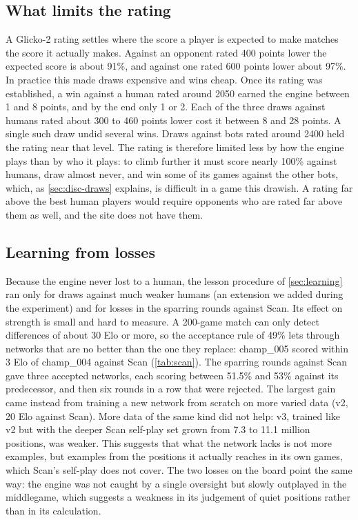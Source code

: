 \subsection{What limits the rating}\label{sec:disc-rating}

A Glicko-2 rating settles where the score a player is expected to make matches the
score it actually makes. Against an opponent rated 400 points lower the expected
score is about 91\%, and against one rated 600 points lower about 97\%. In
practice this made draws expensive and wins cheap. Once its rating was
established, a win against a human rated around 2050 earned the engine between 1
and 8 points, and by the end only 1 or 2. Each of the three draws against humans
rated about 300 to 460 points lower cost it between 8 and 28 points. A
single such draw undid several wins. Draws against bots rated
around 2400 held the rating near that level. The rating is therefore limited less
by how the engine plays than by who it plays: to climb further it must score
nearly 100\% against humans, draw almost never, and win some of its games against
the other bots, which, as \cref{sec:disc-draws} explains, is difficult in a game
this drawish. A rating far above the best human players would require opponents
who are rated far above them as well, and the site does not have them.

\subsection{Learning from losses}\label{sec:disc-learning}

Because the engine never lost to a human, the lesson procedure of
\cref{sec:learning} ran only for draws against much weaker humans (an extension
we added during the experiment) and for losses in the sparring rounds against
Scan. Its effect on strength is small and hard to measure. A 200-game match can
only detect differences of about 30 Elo or more, so the acceptance rule of 49\%
lets through networks that are no better than the one they replace: champ\_005
scored within 3 Elo of champ\_004 against Scan (\cref{tab:scan}). The sparring
rounds against Scan gave three accepted networks, each scoring between 51.5\%
and 53\% against its predecessor, and then six rounds in a row that were
rejected. The largest gain came instead from training a new network from scratch
on more varied data (v2, 20 Elo against Scan). More data of the same kind did
not help: v3, trained like v2 but with the deeper Scan self-play set grown from
7.3 to 11.1 million positions, was weaker. This suggests that what the network lacks is not more examples, but
examples from the positions it actually reaches in its own games, which Scan's
self-play does not cover. The two losses on the board point the same way: the
engine was not caught by a single oversight but slowly outplayed in the
middlegame, which suggests a weakness in its judgement of quiet positions rather
than in its calculation.

